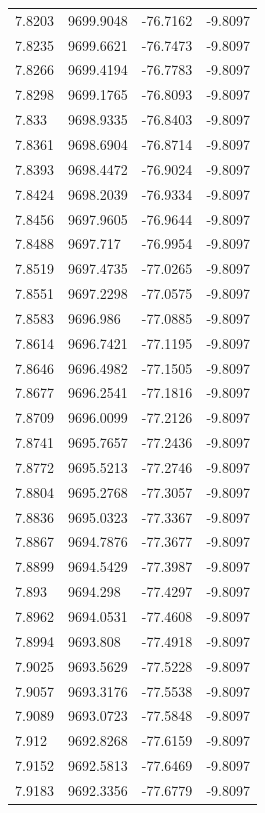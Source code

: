 \begin{table}[H]
\begin{tabular}{llll}
7.8203 & 9699.9048 & -76.7162 & -9.8097 \\
7.8235 & 9699.6621 & -76.7473 & -9.8097 \\
7.8266 & 9699.4194 & -76.7783 & -9.8097 \\
7.8298 & 9699.1765 & -76.8093 & -9.8097 \\
7.833 & 9698.9335 & -76.8403 & -9.8097 \\
7.8361 & 9698.6904 & -76.8714 & -9.8097 \\
7.8393 & 9698.4472 & -76.9024 & -9.8097 \\
7.8424 & 9698.2039 & -76.9334 & -9.8097 \\
7.8456 & 9697.9605 & -76.9644 & -9.8097 \\
7.8488 & 9697.717 & -76.9954 & -9.8097 \\
7.8519 & 9697.4735 & -77.0265 & -9.8097 \\
7.8551 & 9697.2298 & -77.0575 & -9.8097 \\
7.8583 & 9696.986 & -77.0885 & -9.8097 \\
7.8614 & 9696.7421 & -77.1195 & -9.8097 \\
7.8646 & 9696.4982 & -77.1505 & -9.8097 \\
7.8677 & 9696.2541 & -77.1816 & -9.8097 \\
7.8709 & 9696.0099 & -77.2126 & -9.8097 \\
7.8741 & 9695.7657 & -77.2436 & -9.8097 \\
7.8772 & 9695.5213 & -77.2746 & -9.8097 \\
7.8804 & 9695.2768 & -77.3057 & -9.8097 \\
7.8836 & 9695.0323 & -77.3367 & -9.8097 \\
7.8867 & 9694.7876 & -77.3677 & -9.8097 \\
7.8899 & 9694.5429 & -77.3987 & -9.8097 \\
7.893 & 9694.298 & -77.4297 & -9.8097 \\
7.8962 & 9694.0531 & -77.4608 & -9.8097 \\
7.8994 & 9693.808 & -77.4918 & -9.8097 \\
7.9025 & 9693.5629 & -77.5228 & -9.8097 \\
7.9057 & 9693.3176 & -77.5538 & -9.8097 \\
7.9089 & 9693.0723 & -77.5848 & -9.8097 \\
7.912 & 9692.8268 & -77.6159 & -9.8097 \\
7.9152 & 9692.5813 & -77.6469 & -9.8097 \\
7.9183 & 9692.3356 & -77.6779 & -9.8097 \\

\end{tabular}
\end{table}
